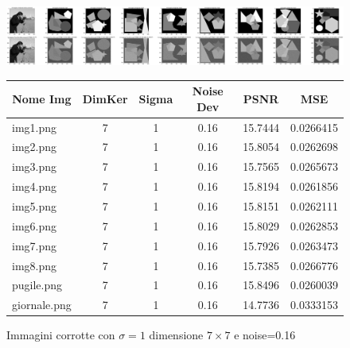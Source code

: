 \begin{figure}[H]
    \centering
    \begin{minipage}[h]{\textwidth}
    \includegraphics[width=\linewidth]{output/tabCorrotte/imgcorr9.png}\label{fig:imgcorrotte7x70.16}
    \end{minipage}
    \begin{minipage}[h]{\textwidth}
        \centering
        
        \begin{tabular}{|l c c c c r|}
            \hline
            \multicolumn{1}{|c}{\textbf{Nome Img}} & \multicolumn{1}{|c}{\textbf{DimKer}} & \multicolumn{1}{|c}{\textbf{Sigma}} & \multicolumn{1}{|c}{\textbf{Noise Dev}} & \multicolumn{1}{|c}{\textbf{PSNR}} & \multicolumn{1}{|c|}{\textbf{MSE}} \\ \hline
                img1.png & 7 & 1 & 0.16 & 15.7444 & 0.0266415 \\
                img2.png & 7 & 1 & 0.16 & 15.8054 & 0.0262698 \\ 
                img3.png & 7 & 1 & 0.16 & 15.7565 & 0.0265673 \\                 
                img4.png & 7 & 1 & 0.16 & 15.8194 & 0.0261856 \\
                img5.png & 7 & 1 & 0.16 & 15.8151 & 0.0262111 \\                 
                img6.png & 7 & 1 & 0.16 & 15.8029 & 0.0262853 \\
                img7.png & 7 & 1 & 0.16 & 15.7926 & 0.0263473 \\                 
                img8.png & 7 & 1 & 0.16 & 15.7385 & 0.0266776 \\
                pugile.png & 7 & 1 & 0.16 & 15.8496 & 0.0260039 \\
                giornale.png & 7 & 1 & 0.16 & 14.7736 & 0.0333153\\ \hline
            \end{tabular}\label{tab:tabcorrotte7x70.16}   
        
        \end{minipage}
    \captionsetup{labelformat=andtable}
    \caption{Immagini corrotte con $\sigma = 1$ dimensione $7 \times 7$ e noise=0.16}
\end{figure}

